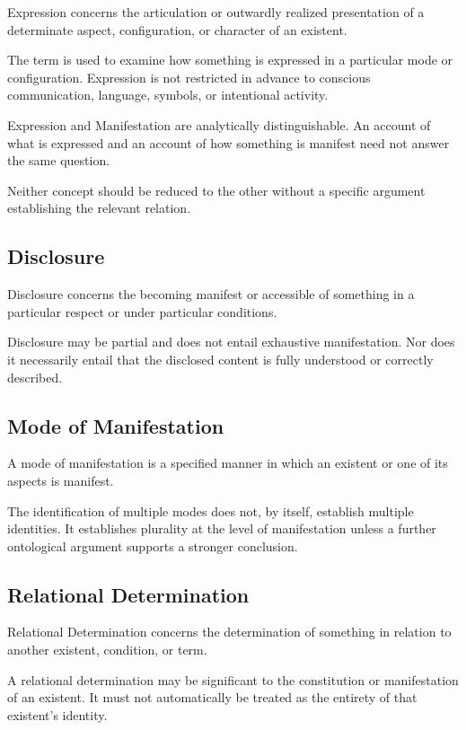Expression concerns the articulation or outwardly realized presentation
of a determinate aspect, configuration, or character of an existent.

The term is used to examine how something is expressed in a particular
mode or configuration. Expression is not restricted in advance to
conscious communication, language, symbols, or intentional activity.

Expression and Manifestation are analytically distinguishable.
An account of what is expressed and an account of how something is
manifest need not answer the same question.

Neither concept should be reduced to the other without a specific
argument establishing the relevant relation.


\subsection*{Disclosure}

Disclosure concerns the becoming manifest or accessible of something
in a particular respect or under particular conditions.

Disclosure may be partial and does not entail exhaustive manifestation.
Nor does it necessarily entail that the disclosed content is fully
understood or correctly described.


\subsection*{Mode of Manifestation}

A mode of manifestation is a specified manner in which an existent
or one of its aspects is manifest.

The identification of multiple modes does not, by itself, establish
multiple identities. It establishes plurality at the level of
manifestation unless a further ontological argument supports a
stronger conclusion.


\subsection*{Relational Determination}

Relational Determination concerns the determination of something
in relation to another existent, condition, or term.

A relational determination may be significant to the constitution
or manifestation of an existent. It must not automatically be treated
as the entirety of that existent's identity.

